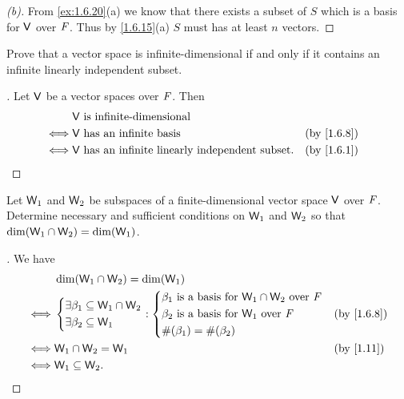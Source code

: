 \begin{proof}[(b)]
  From \cref{ex:1.6.20}(a) we know that there exists a subset of \(S\) which is a basis for \(\mathsf{V}\) over \(\mathit{F}\).
  Thus by \cref{1.6.15}(a) \(S\) must has at least \(n\) vectors.
\end{proof}

\begin{ex}\label{ex:1.6.21}
  Prove that a vector space is infinite-dimensional if and only if it contains an infinite linearly independent subset.
\end{ex}

\begin{proof}[]
  Let \(\mathsf{V}\) be a vector spaces over \(\mathit{F}\).
  Then
  \begin{align*}
         & \V \text{ is infinite-dimensional}                                                    \\
    \iff & \V \text{ has an infinite basis}                        &  & \text{(by \cref{1.6.8})} \\
    \iff & \V \text{ has an infinite linearly independent subset}. &  & \text{(by \cref{1.6.1})}
  \end{align*}
\end{proof}

\begin{ex}\label{ex:1.6.22}
  Let \(\mathsf{W}_1\) and \(\mathsf{W}_2\) be subspaces of a finite-dimensional vector space \(\mathsf{V}\) over \(\mathit{F}\).
  Determine necessary and sufficient conditions on \(\mathsf{W}_1\) and \(\mathsf{W}_2\) so that \(\dim(\mathsf{W}_1 \cap \mathsf{W}_2) = \dim(\mathsf{W}_1)\).
\end{ex}

\begin{proof}[]
  We have
  \begin{align*}
         & \dim(\W_1 \cap \W_2) = \dim(\W_1)                                                     \\
    \iff & \begin{dcases}
      \exists \beta_1 \subseteq \W_1 \cap \W_2 \\
      \exists \beta_2 \subseteq \W_1
    \end{dcases} : \begin{dcases}
      \beta_1 \text{ is a basis for } \W_1 \cap \W_2 \text{ over } \F \\
      \beta_2 \text{ is a basis for } \W_1 \text{ over } \F           \\
      \#(\beta_1) = \#(\beta_2)
    \end{dcases} &  & \text{(by \cref{1.6.8})} \\
    \iff & \W_1 \cap \W_2 = \W_1                                   &  & \text{(by \cref{1.11})}  \\
    \iff & \W_1 \subseteq \W_2.
  \end{align*}
\end{proof}

